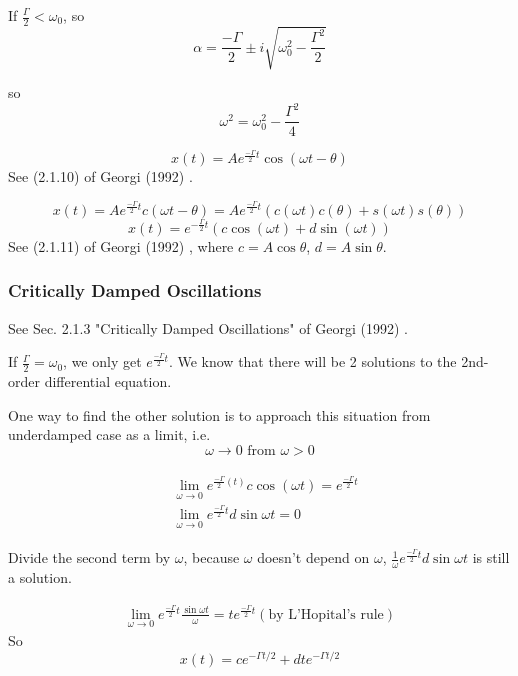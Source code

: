 \documentclass[10pt]{amsart}
\begin{document}
\begin{multicols*}{2}
If $\frac{\Gamma}{2} < \omega_0$, so
\[
\alpha = \frac{-\Gamma }{2} \pm i \sqrt{ \omega_0^2 - \frac{\Gamma^2}{2} } 
\]

so 
\begin{equation}
	\omega^2 = \omega_0^2 - \frac{ \Gamma^2}{4}
\end{equation}

\begin{equation}
	x(t) = Ae^{\frac{-\Gamma}{2} t} \cos{ (\omega t- \theta)}
\end{equation}
See (2.1.10) of Georgi (1992) \cite{Geor1992}.

\[
x(t) = A e^{\frac{-\Gamma}{2} t} c(\omega t - \theta) = Ae^{\frac{-\Gamma}{2}t } (c(\omega t) c(\theta) + s(\omega t) s(\theta))
\]
\begin{equation}\label{Eq:UnderdampedOscillationsSolution}
	x(t) = e^{-\frac{\Gamma}{2}t} (c \cos{(\omega t)} + d\sin{(\omega t)})
\end{equation}
See (2.1.11) of Georgi (1992) \cite{Geor1992}, where $c= A\cos{\theta}$, $d=A\sin{\theta}$.

\subsubsection{Critically Damped Oscillations} See Sec. 2.1.3 "Critically Damped Oscillations" of Georgi (1992) \cite{Geor1992}.

If $\frac{\Gamma}{2} = \omega_0$, we only get $e^{\frac{-\Gamma}{2} t}$. We know that there will be 2 solutions to the 2nd-order differential equation.

One way to find the other solution is to approach this situation from underdamped case as a limit, i.e.
\[
\omega \to 0 \text{ from } \omega > 0
\]

\[
\begin{gathered}
	\begin{aligned}
		& \lim_{\omega \to 0} e^{ \frac{-\Gamma}{2}(t) } c\cos{(\omega t)} = e^{ \frac{-\Gamma}{2} t} \\
		& \lim_{\omega\to 0} e^{\frac{-\Gamma}{2} t} d \sin{\omega t} = 0
	\end{aligned}
\end{gathered}
\]

Divide the second term by $\omega$, because $\omega$ doesn't depend on $\omega$, $\frac{1}{\omega} e^{\frac{-\Gamma}{2} t} d\sin{\omega t}$ is still a solution.

\[
\begin{gathered}
	\lim_{\omega \to 0} e^{ \frac{-\Gamma}{2} t} \frac{ \sin{ \omega t} }{\omega} = te^{\frac{-\Gamma}{2} t} (\text{by L'Hopital's rule})
\end{gathered}
\]
So
\[
x(t) = ce^{ - \Gamma t/2} + dte^{-\Gamma t/2}
\]


\end{multicols*}
\end{document}
